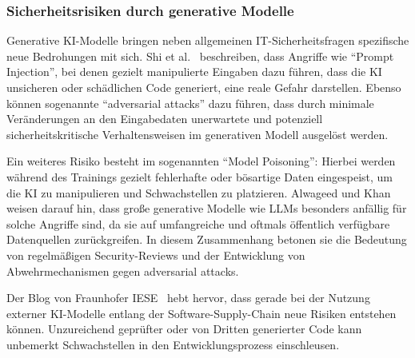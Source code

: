 \subsubsection{Sicherheitsrisiken durch generative Modelle}

Generative KI-Modelle bringen neben allgemeinen IT-Sicherheitsfragen
spezifische neue Bedrohungen mit sich. Shi et al.~\cite{shi_ai-assisted_2023}
beschreiben, dass Angriffe wie \enquote{Prompt Injection}, bei denen gezielt
manipulierte Eingaben dazu führen, dass die KI unsicheren oder schädlichen Code
generiert, eine reale Gefahr darstellen. Ebenso können sogenannte
\enquote{adversarial attacks} dazu führen, dass durch minimale Veränderungen an
den Eingabedaten unerwartete und potenziell sicherheitskritische
Verhaltensweisen im generativen Modell ausgelöst werden.

Ein weiteres Risiko besteht im sogenannten \enquote{Model Poisoning}: Hierbei
werden während des Trainings gezielt fehlerhafte oder bösartige Daten
eingespeist, um die KI zu manipulieren und Schwachstellen zu platzieren.
Alwageed und Khan~\cite{alwageed_role_nodate} weisen darauf hin, dass große
generative Modelle wie LLMs besonders anfällig für solche Angriffe sind, da sie
auf umfangreiche und oftmals öffentlich verfügbare Datenquellen zurückgreifen.
In diesem Zusammenhang betonen sie die Bedeutung von regelmäßigen
Security-Reviews und der Entwicklung von Abwehrmechanismen gegen adversarial
attacks.

Der Blog von Fraunhofer IESE~\cite{siebert_generative_2024} hebt hervor, dass
gerade bei der Nutzung externer KI-Modelle entlang der Software-Supply-Chain
neue Risiken entstehen können. Unzureichend geprüfter oder von Dritten
generierter Code kann unbemerkt Schwachstellen in den Entwicklungsprozess
einschleusen.
